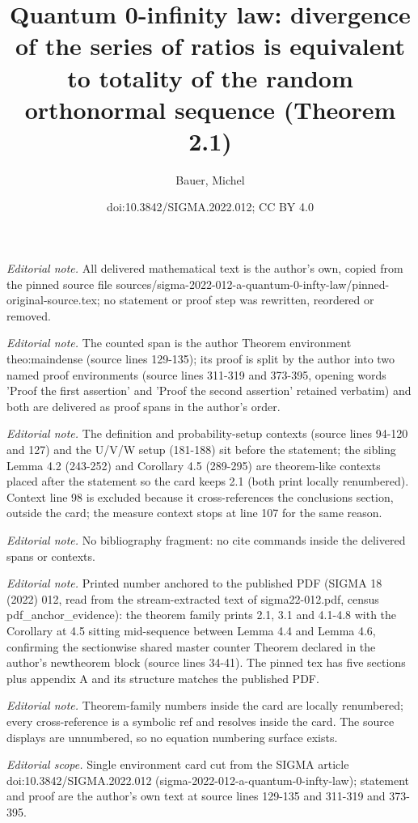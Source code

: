 \documentclass[10pt,a4paper]{article}
\title{Quantum 0-infinity law: divergence of the series of ratios is equivalent to totality of the random orthonormal sequence (Theorem 2.1)}
\author{Bauer, Michel}
\date{doi:10.3842/SIGMA.2022.012; CC BY 4.0}
\begin{document}
\maketitle
\setcounter{section}{2}
\setcounter{Theorem}{0}
\noindent\textit{Editorial note.} All delivered mathematical text is the author's own, copied from the pinned source file sources/sigma-2022-012-a-quantum-0-infty-law/pinned-original-source.tex; no statement or proof step was rewritten, reordered or removed.\par\medskip
\noindent\textit{Editorial note.} The counted span is the author Theorem environment theo:maindense (source lines 129-135); its proof is split by the author into two named proof environments (source lines 311-319 and 373-395, opening words 'Proof the first assertion' and 'Proof the second assertion' retained verbatim) and both are delivered as proof spans in the author's order.\par\medskip
\noindent\textit{Editorial note.} The definition and probability-setup contexts (source lines 94-120 and 127) and the U/V/W setup (181-188) sit before the statement; the sibling Lemma 4.2 (243-252) and Corollary 4.5 (289-295) are theorem-like contexts placed after the statement so the card keeps 2.1 (both print locally renumbered). Context line 98 is excluded because it cross-references the conclusions section, outside the card; the measure context stops at line 107 for the same reason.\par\medskip
\noindent\textit{Editorial note.} No bibliography fragment: no cite commands inside the delivered spans or contexts.\par\medskip
\noindent\textit{Editorial note.} Printed number anchored to the published PDF (SIGMA 18 (2022) 012, read from the stream-extracted text of sigma22-012.pdf, census pdf\_anchor\_evidence): the theorem family prints 2.1, 3.1 and 4.1-4.8 with the Corollary at 4.5 sitting mid-sequence between Lemma 4.4 and Lemma 4.6, confirming the sectionwise shared master counter Theorem declared in the author's newtheorem block (source lines 34-41). The pinned tex has five sections plus appendix A and its structure matches the published PDF.\par\medskip
\noindent\textit{Editorial note.} Theorem-family numbers inside the card are locally renumbered; every cross-reference is a symbolic ref and resolves inside the card. The source displays are unnumbered, so no equation numbering surface exists.\par\medskip
\noindent\textit{Editorial scope.} Single environment card cut from the SIGMA article doi:10.3842/SIGMA.2022.012 (sigma-2022-012-a-quantum-0-infty-law); statement and proof are the author's own text at source lines 129-135 and 311-319 and 373-395.\par\medskip
\end{document}
